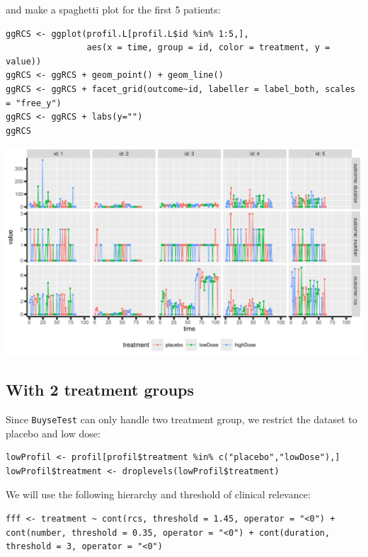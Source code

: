 \documentclass[12pt]{article}
\begin{document}
and make a spaghetti plot for the first 5 patients:
\lstset{language=r,label= ,caption= ,captionpos=b,numbers=none}
\begin{lstlisting}
ggRCS <- ggplot(profil.L[profil.L$id %in% 1:5,],
                aes(x = time, group = id, color = treatment, y = value))
ggRCS <- ggRCS + geom_point() + geom_line() 
ggRCS <- ggRCS + facet_grid(outcome~id, labeller = label_both, scales = "free_y")
ggRCS <- ggRCS + labs(y="")
ggRCS
\end{lstlisting}

\begin{center}
\includegraphics[trim={0 0 0 0},width=1\textwidth]{./figures/spaghetti-Nof1.pdf}
\end{center}

\subsection{With 2 treatment groups}
\label{sec:org15d8521}

\noindent Since \texttt{BuyseTest} can only handle two treatment group, we restrict the
dataset to placebo and low dose:
\lstset{language=r,label= ,caption= ,captionpos=b,numbers=none}
\begin{lstlisting}
lowProfil <- profil[profil$treatment %in% c("placebo","lowDose"),]
lowProfil$treatment <- droplevels(lowProfil$treatment)
\end{lstlisting}

We will use the following hierarchy and threshold of clinical
relevance:
\lstset{language=r,label= ,caption= ,captionpos=b,numbers=none}
\begin{lstlisting}
fff <- treatment ~ cont(rcs, threshold = 1.45, operator = "<0") + cont(number, threshold = 0.35, operator = "<0") + cont(duration, threshold = 3, operator = "<0")
\end{lstlisting}
\end{document}
